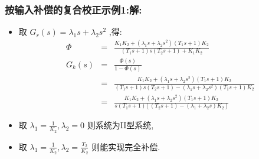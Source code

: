 \documentclass[table]{article}
\begin{document}
\begin{frame}
\frametitle{按输入补偿的复合校正示例1:解:}
\label{sec-4-3-11}

\begin{itemize}
\item 取  $G_r(s)=\lambda_1 s+\lambda_2 s^2$ ,得:
      \begin{eqnarray*}
      \Phi &= &\frac{K_1K_2+(\lambda_1 s +\lambda_2 s^2)(T_1 s+1) K_2}{(T_1 s+1)s(T_2 s+1)+K_1K_2} \\
      G_k(s) &=& \frac{\Phi(s)}{1-\Phi(s)} \\
       &=&  \frac{K_1K_2+(\lambda_1 s+\lambda_2 s^2)(T_1 s+1) K_2}{(T_1 s+1)s(T_2 s+1)-(\lambda_1 s + \lambda_2 s^2) (T_1 s+1) K_2} \\
       &=&  \frac{K_1K_2+(\lambda_1 s+\lambda_2 s^2)(T_1 s+1) K_2}{s(T_1 s+1)[(T_2 s+1)-(\lambda_1+\lambda_2 s) K_2]} 
      \end{eqnarray*}
\item 取  $\lambda_{1}=\frac{1}{K_2},\lambda_2=0$  则系统为II型系统,
\item 取  $\lambda_{1}=\frac{1}{K_2},\lambda_2=\frac{T_2}{K_2}$ 则能实现完全补偿.
\end{itemize}
\end{frame}
\end{document}
